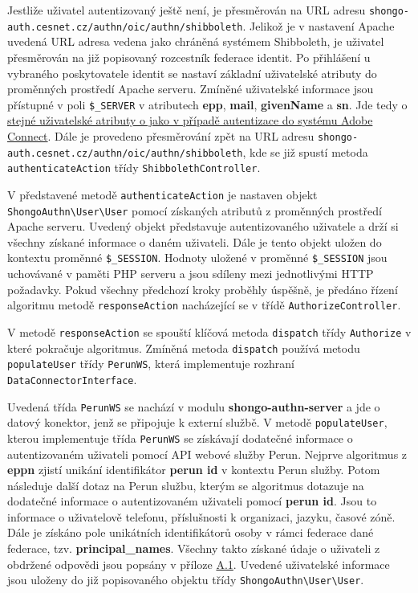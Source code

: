 \documentclass[
  printed, %
  twoside, %
  table,   %
  nolof,     %
  nolot,     %
]{fithesis3}
\begin{document}
Jestliže uživatel autentizovaný ještě není, je přesměrován na URL adresu \texttt{shongo-auth.cesnet.cz/authn/oic/authn/shibboleth}. Jelikož je v nastavení Apache uvedená URL adresa vedena jako chráněná systémem Shibboleth, je uživatel přesměrován na již popisovaný rozcestník federace identit. Po přihlášení u vybraného poskytovatele identit se nastaví základní uživatelské atributy do proměnných prostředí Apache serveru. Zmíněné uživatelské informace jsou přístupné v poli \texttt{\$\_SERVER} v atributech \textbf{epp}, \textbf{mail}, \textbf{givenName} a \textbf{sn}. Jde tedy o \hyperref[item:adobe-connect]{stejné uživatelské atributy o jako v případě autentizace do systému Adobe Connect}. Dále je provedeno přesměrování zpět na URL adresu \texttt{shongo-auth.cesnet.cz/authn/oic/authn/shibboleth}, kde se již spustí metoda \texttt{authenticateAction} třídy \texttt{ShibbolethController}. \par

V představené metodě \texttt{authenticateAction} je nastaven objekt \texttt{ShongoAuthn\textbackslash User\textbackslash User} pomocí získaných atributů z proměnných prostředí Apache serveru. Uvedený objekt představuje autentizovaného uživatele a drží si všechny získané informace o daném uživateli. Dále je tento objekt uložen do kontextu proměnné \texttt{\$\_SESSION}. Hodnoty uložené v proměnné \texttt{\$\_SESSION} jsou uchovávané v paměti PHP serveru a jsou sdíleny mezi jednotlivými HTTP požadavky. Pokud všechny předchozí kroky proběhly úspěšně, je předáno řízení algoritmu metodě \texttt{responseAction} nacházející se v třídě \texttt{AuthorizeController}. \par

\label{sec:responseAction}
V metodě \texttt{responseAction} se spouští klíčová metoda \texttt{dispatch} třídy \texttt{Authorize} v které pokračuje algoritmus. Zmíněná metoda \texttt{dispatch} používá metodu \texttt{populateUser} třídy \texttt{PerunWS}, která implementuje rozhraní \texttt{DataConnectorInterface}. \par

Uvedená třída \texttt{PerunWS} se nachází v modulu \textbf{shongo-authn-server} a jde o datový konektor, jenž se připojuje k externí službě. V metodě \texttt{populateUser}, kterou implementuje třída \texttt{PerunWS} se získávají dodatečné informace o autentizovaném uživateli pomocí API webové služby Perun. Nejprve algoritmus z \textbf{eppn} zjistí unikání identifikátor \textbf{perun id} v kontextu Perun služby. Potom následuje další dotaz na Perun službu, kterým se algoritmus dotazuje na dodatečné informace o autentizovaném uživateli pomocí \textbf{perun id}. Jsou to informace o uživatelově telefonu, příslušnosti k organizaci, jazyku, časové zóně. Dále je získáno pole unikátních identifikátorů osoby v rámci federace dané federace, tzv. \textbf{principal\_names}. Všechny takto získané údaje o uživateli z obdržené odpovědi jsou popsány v příloze \hyperref[table:perunws:user]{A.1}. Uvedené uživatelské informace jsou uloženy do již popisovaného objektu třídy \texttt{ShongoAuthn\textbackslash User\textbackslash User}. \par
\end{document}
